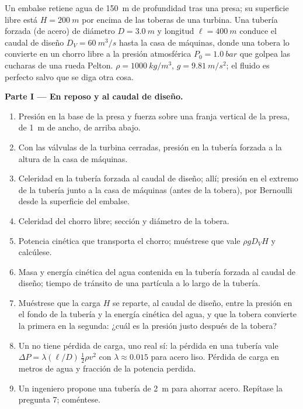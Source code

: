 \begin{problem}
\label{pb:b2:euler-bernoulli:1}

Un embalse retiene agua de \qty{150}{m} de profundidad tras una presa; su
superficie libre está $H = \qty{200}{m}$ por encima de las toberas de una
turbina. Una tubería forzada (de acero) de diámetro $D = \qty{3.0}{m}$ y
longitud $\ell = \qty{400}{m}$ conduce el caudal de diseño
$D_V = \qty{60}{m^3/s}$ hasta la casa de máquinas, donde una tobera lo
convierte en un chorro libre a la presión atmosférica $P_0 =
\qty{1.0}{bar}$ que golpea las cucharas de una rueda Pelton. $\rho =
\qty{1000}{kg/m^3}$, $g = \qty{9.81}{m/s^2}$; el fluido es perfecto salvo
que se diga otra cosa.

\medskip
\noindent\textbf{Parte I --- En reposo y al caudal de diseño.}
\begin{enumerate}
  \item Presión en la base de la presa y fuerza sobre una franja vertical
        de la presa, de \qty{1}{m} de ancho, de arriba abajo.
  \item Con las válvulas de la turbina cerradas, presión en la tubería
        forzada a la altura de la casa de máquinas.
  \item Celeridad en la tubería forzada al caudal de diseño;  allí; presión en el extremo de la tubería junto a la casa
        de máquinas (antes de la tobera), por Bernoulli desde la
        superficie del embalse.
  \item Celeridad del chorro libre; sección y diámetro de la tobera.
  \item Potencia cinética que transporta el chorro; muéstrese que vale
        $\rho gD_VH$ y calcúlese.
  \item Masa y energía cinética del agua contenida en la tubería forzada
        al caudal de diseño; tiempo de tránsito de una partícula a lo
        largo de la tubería.
  \item Muéstrese que la carga $H$ se reparte, al caudal de diseño, entre
        la presión en el fondo de la tubería y la energía cinética del
        agua, y que la tobera convierte la primera en la segunda: ¿cuál es
        la presión justo después de la tobera?
  \item Un  no tiene pérdida de carga, uno real sí: la
        pérdida en una tubería vale $\Delta P = \lambda(\ell/D)\,\tfrac12\rho v^2$ con $\lambda
        \approx 0.015$ para acero liso. Pérdida de carga en metros de agua
        y fracción de la potencia perdida.
  \item Un ingeniero propone una tubería de \qty{2}{m} para ahorrar acero.
        Repítase la pregunta 7; coméntese.
\end{enumerate}


\end{problem}
